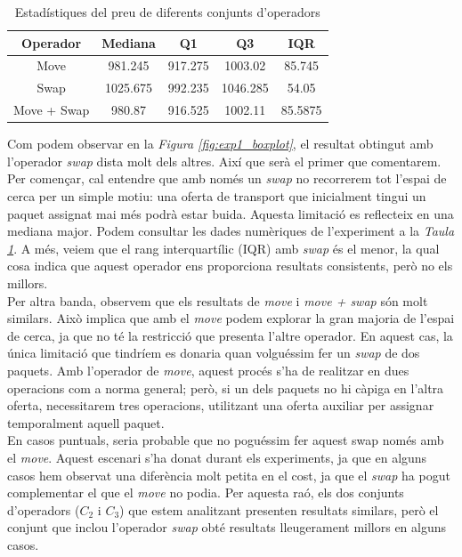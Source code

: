 \documentclass[a4paper]{article}
\begin{document}
	\begin{table}[H]
		\centering
		\begin{tabular}{|c|c|c|c|c|}
			\hline
			\textbf{Operador} & \textbf{Mediana} & \textbf{Q1} & \textbf{Q3} & \textbf{IQR} \\
			\hline
			Move & 981.245 & 917.275 & 1003.02 & 85.745 \\
			\hline
			Swap & 1025.675 & 992.235 & 1046.285 & 54.05 \\
			\hline
			Move + Swap & 980.87 & 916.525 & 1002.11 & 85.5875\\
			\hline
		\end{tabular}
		\caption{Estadístiques del preu de diferents conjunts d'operadors}
		\label{tab:exp1_estadisticas}
	\end{table}
	
	Com podem observar en la \textit{Figura \ref{fig:exp1_boxplot}}, el resultat obtingut amb l'operador \textit{swap} dista molt dels altres. Així que serà el primer que comentarem. Per començar, cal entendre que amb només un \textit{swap} no recorrerem tot l'espai de cerca per un simple motiu: una oferta de transport que inicialment tingui un paquet assignat mai més podrà estar buida. Aquesta limitació es reflecteix en una mediana major. Podem consultar les dades numèriques de l'experiment a la \textit{Taula \ref{tab:exp1_estadisticas}}. A més, veiem que el rang interquartílic (IQR) amb \textit{swap} és el menor, la qual cosa indica que aquest operador ens proporciona resultats consistents, però no els millors. \\
	
	Per altra banda, observem que els resultats de \textit{move} i \textit{move + swap} són molt similars. Això implica que amb el \textit{move} podem explorar la gran majoria de l'espai de cerca, ja que no té la restricció que presenta l'altre operador. En aquest cas, la única limitació que tindríem es donaria quan volguéssim fer un \textit{swap} de dos paquets. Amb l'operador de \textit{move}, aquest procés s'ha de realitzar en dues operacions com a norma general; però, si un dels paquets no hi càpiga en l'altra oferta, necessitarem tres operacions, utilitzant una oferta auxiliar per assignar temporalment aquell paquet. \\
	
	En casos puntuals, seria probable que no poguéssim fer aquest swap només amb el \textit{move}. Aquest escenari s'ha donat durant els experiments, ja que en alguns casos hem observat una diferència molt petita en el cost, ja que el \textit{swap} ha pogut complementar el que el \textit{move} no podia. Per aquesta raó, els dos conjunts d'operadors ($C_2$ i $C_3$) que estem analitzant presenten resultats similars, però el conjunt que inclou l'operador \textit{swap} obté resultats lleugerament millors en alguns casos. \\
	
\end{document}
